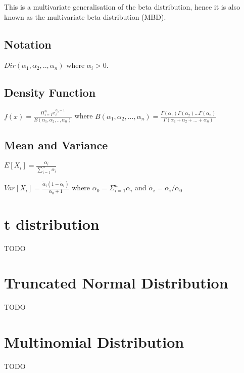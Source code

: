 \documentclass{article}
\begin{document}
\begin{multicols*}{2}
This is a multivariate generalisation of the beta distribution, hence it is also known as the multivariate beta distribution (MBD).

\subsection{Notation}

$Dir(\alpha_{1}, \alpha_{2}, .., \alpha_{n})$ where $\alpha_{i} > 0$.

\subsection{Density Function}

$f(x) = \frac{\Pi_{i=1}^{n} x_{i}^{\alpha_{i} - 1}}{B(\alpha_{1}, \alpha_{2}, .., \alpha_{n})}$
where $B(\alpha_{1}, \alpha_{2}, ..., \alpha_{n}) = \frac{\Gamma(\alpha_{1})\Gamma(\alpha_{2})...\Gamma(\alpha_{n})}{\Gamma(\alpha_{1} + \alpha_{2} + ... + \alpha_{n})}$

\subsection{Mean and Variance}

$E[X_{i}] = \frac{\alpha_{i}}{\sum_{i=1}^{n} \alpha_{i}}$

$Var[X_{i}] = \frac{\tilde{\alpha}_{i}(1-\tilde{\alpha}_{i})}{\alpha_{0} + 1}$
where $\alpha_{0} = \Sigma_{i=1}^{n} \alpha_{i}$ and $\tilde{\alpha}_{i} = \alpha_{i} / \alpha_{0}$

\section{t distribution}
\label{sec:t-dist}

TODO

\section{Truncated Normal Distribution}
\label{sec:trunc-norm-dist}

TODO

\section{Multinomial Distribution}
\label{sec:multinomial-dist}

TODO

\end{multicols*}
\end{document}
